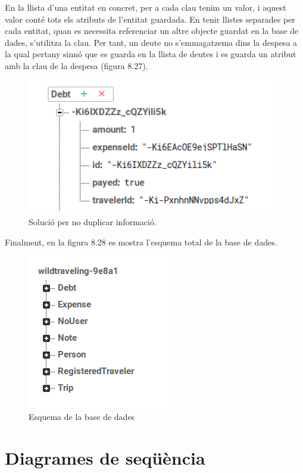En la llista d'una entitat en concret, per a cada clau tenim un valor, i aquest valor conté tots els atributs de l'entitat guardada. En tenir llistes separades per cada entitat, quan es necessita referenciar un altre objecte guardat en la base de dades, s'utilitza la clau. Per tant, un deute no s'emmagatzema dins la despesa a la qual pertany sinnó que es guarda en la llista de deutes i es guarda un atribut amb la clau de la despesa (figura 8.27).


\begin{figure}[!h]
\centering
\includegraphics[scale=1.00]{Figures/DebtBD.jpg}
\caption{Solució per no duplicar informació.}
\end{figure}

\clearpage

Finalment, en la figura 8.28 es mostra l'esquema total de la base de dades.

\begin{figure}[!h]
\centering
\includegraphics[scale=1.00]{Figures/esquemabdGeneral.png}
\caption{Esquema de la base de dades}
\end{figure}

\section{Diagrames de seqüència}

